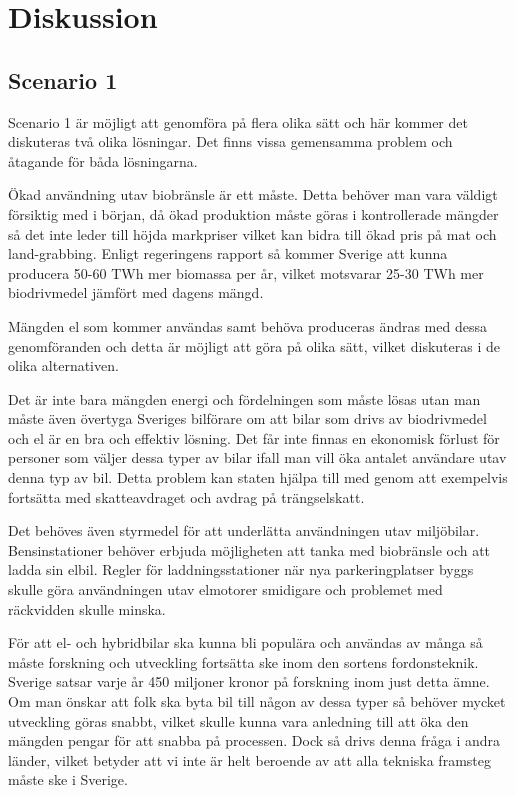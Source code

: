 \documentclass[a4paper,11pt,fleqn, titlepage]{article}
\begin{document}
\section{Diskussion}

\subsection{Scenario 1}
\label{subsec:scen1}
Scenario 1 är möjligt att genomföra på flera olika sätt och här kommer det diskuteras två olika lösningar.
Det finns vissa gemensamma problem och åtagande för båda lösningarna.

Ökad användning utav biobränsle är ett måste. Detta behöver man vara väldigt försiktig med i början, då ökad produktion måste göras i kontrollerade mängder så det inte leder till höjda markpriser vilket kan bidra till ökad pris på mat och land-grabbing.
Enligt regeringens rapport så kommer Sverige att kunna producera 50-60 TWh mer biomassa per år, vilket motsvarar 25-30 TWh mer biodrivmedel jämfört med dagens mängd.

Mängden el som kommer användas samt behöva produceras ändras med dessa genomföranden och detta är möjligt att göra på olika sätt, vilket diskuteras i de olika alternativen.

Det är inte bara mängden energi och fördelningen som måste lösas utan man måste även övertyga Sveriges bilförare om att bilar som drivs av biodrivmedel och el är en bra och effektiv lösning.
Det får inte finnas en ekonomisk förlust för personer som väljer dessa typer av bilar ifall man vill öka antalet användare utav denna typ av bil. Detta problem kan staten hjälpa till med genom att exempelvis fortsätta med skatteavdraget och avdrag på trängselskatt.

Det behöves även styrmedel för att underlätta användningen utav miljöbilar. Bensinstationer behöver erbjuda möjligheten att tanka med biobränsle och att ladda sin elbil. Regler för laddningsstationer när nya parkeringplatser byggs skulle göra användningen utav elmotorer smidigare och problemet med räckvidden skulle minska.

För att el- och hybridbilar ska kunna bli populära och användas av många så måste forskning och utveckling fortsätta ske inom den sortens fordonsteknik. Sverige satsar varje år 450 miljoner kronor på forskning inom just detta ämne\cite[s.~44]{elforskelbil}. Om man önskar att folk ska byta bil till någon av dessa typer så behöver mycket utveckling göras snabbt, vilket skulle kunna vara anledning till att öka den mängden pengar för att snabba på processen. Dock så drivs denna fråga i andra länder, vilket betyder att vi inte är helt beroende av att alla tekniska framsteg måste ske i Sverige.
\end{document}
